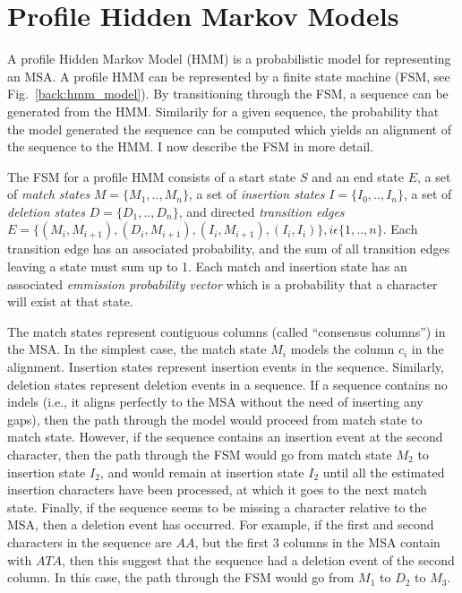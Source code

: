 \section{Profile Hidden Markov Models}\label{back:hmm}
A profile Hidden Markov Model (HMM) is a probabilistic model for representing an MSA.  
A profile HMM can be represented by a finite state machine (FSM, see Fig.~\ref{back:hmm_model}).  By transitioning through the FSM, a sequence can be generated from the HMM.  Similarily for a given sequence, the probability that the model generated the sequence can be computed which yields an alignment of the sequence to the HMM.   I now describe the FSM in more detail.

The FSM for a profile HMM consists of a start state $S$ and an end state $E$, a set of \emph{match states} $M=\{M_1,..,M_n\}$, a set of \emph{insertion states } $I=\{I_0,..,I_n\}$, a set of \emph{deletion states} $D=\{D_1,..,D_n\}$, and directed \emph{transition edges} $E=\{(M_i,M_{i+1}),(D_i,M_{i+1}),(I_i,M_{i+1}),(I_i,I_i)\}, i\epsilon \{1,..,n\}$.  Each transition edge has an associated probability, and the sum of all transition edges leaving a state must sum up to 1.  Each match and insertion state has an associated \emph{emmission probability vector} which is a probability that a character will exist at that state.

The match states represent contiguous columns (called ``consensus columns'') in the MSA.  In the simplest case, the match state $M_i$ models the column $c_i$ in the alignment.  Insertion states represent insertion events in the sequence.  Similarly, deletion states represent deletion events in a sequence.  If a sequence contains no indels (i.e., it aligns perfectly to the MSA without the need of inserting any gaps), then the path through the model would proceed from match state to match state.  However, if the sequence contains an insertion event at the second character, then the path through the FSM would go from match state $M_2$ to insertion state $I_2$, and would remain at insertion state $I_2$ until all the estimated insertion characters have been processed, at which it goes to the next match state.  Finally, if the sequence seems to be missing a character relative to the MSA, then a deletion event has occurred.  For example, if the first and second characters in the sequence are $AA$, but the first 3 columns in the MSA contain with $ATA$, then this suggest that the sequence had a deletion event of the second column.  In this case, the path through the FSM would go from $M_1$ to $D_2$ to $M_3$.  

